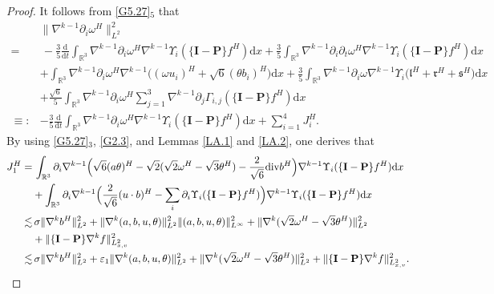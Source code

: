 \documentclass[reqno,11pt]{amsart}
\theoremstyle{plain}
\numberwithin{equation}{section}
\newcommand{\eps}{{\varepsilon}}
\begin{document}
\begin{proof}
It follows from \eqref{G5.27}$_5$ that
\begin{align}\label{G5.35}
 &\|\nabla^{k-1} \partial_i \omega^H\|_{L^2}^2\nonumber\\
=&\,  -\frac{3}{5} \frac{\mathrm{d}}{\mathrm{d} t} \int_{\mathbb{R}^3} \nabla^{k-1} \partial_i \omega^H \nabla^{k-1} \Upsilon_i(\{\mathbf{I}-\mathbf{P}\} f^H) \mathrm{d} x+\frac{3}{5} \int_{\mathbb{R}^3} \nabla^{k-1} \partial_i \partial_t \omega^H \nabla^{k-1} \Upsilon_i(\{\mathbf{I}-\mathbf{P}\} f^H) \mathrm{d} x \nonumber\\
& +\int_{\mathbb{R}^3} \nabla^{k-1} \partial_i \omega^H \nabla^{k-1} \big((\omega u_i)^H+\sqrt{6} (\theta b_i)^H \big) \mathrm{d} x+\frac{3}{5}\int_{\mathbb{R}^3} \nabla^{k-1} \partial_i \omega \nabla^{k-1}
 \Upsilon_i\big(\mathfrak{l}^H+\mathfrak{r}^H+\mathfrak{s}^H\big) \mathrm{d} x \nonumber\\
& +\frac{\sqrt{6}}{5} \int_{\mathbb{R}^3} \nabla^{k-1} \partial_i \omega^H    \sum_{j=1}^3 \nabla^{k-1}\partial_j \Gamma_{i, j}(\{\mathbf{I}-\mathbf{P}\} f^H)  \mathrm{d} x\nonumber\\
\equiv:& -\frac{3}{5} \frac{\mathrm{d}}{\mathrm{d} t} \int_{\mathbb{R}^3} \nabla^{k-1} \partial_i \omega^H \nabla^{k-1} \Upsilon_i(\{\mathbf{I}-\mathbf{P}\} f^H) \mathrm{d}x+\sum_{i=1}^4J_i^H.
\end{align}
By using \eqref{G5.27}$_3$, \eqref{G2.3}, and Lemmas \ref{LA.1} and \ref{LA.2}, one derives  that 
\begin{align}\label{G5.36}
J_1^H
= &\, \int_{\mathbb{R}^3} \partial_i \nabla^{k-1}\Big(\sqrt{6} (a \theta)^H-\sqrt{2}(\sqrt{2} \omega^H-\sqrt{3} \theta^H)-\frac{2}{\sqrt{6}} {\rm div}  b^H\Big)\nabla^{k-1} \Upsilon_i(\{\mathbf{I}-\mathbf{P}\} f^H) \mathrm{d} x \nonumber\\
&  +\int_{\mathbb{R}^3}\partial_i \nabla^{k-1}\Big(\frac{2}{\sqrt{6}} (u \cdot b)^H-\sum_i \partial_i \Upsilon_i(\{\mathbf{I}-\mathbf{P}\} f^H)\Big)  \nabla^{k-1} \Upsilon_i(\{\mathbf{I}-\mathbf{P}\} f^H) \mathrm{d} x \nonumber\\
\lesssim&\,  \sigma\|\nabla^k b^H\|_{L^2}^2+\|\nabla^k (a,b,u,\theta)\|_{L^2}^2\|(a,b,u,\theta)\|_{L^\infty}^2+\|\nabla^k(\sqrt{2}\omega^H-\sqrt{3}\theta^H)\|_{L^2}^2\nonumber\\
&+ \|\{\mathbf{I}-\mathbf{P}\} \nabla^k f\|_{L_{x,v}^2  }^2\nonumber\\
\lesssim&\,\sigma\|\nabla^k b^H\|_{L^2}^2+\eps_1\|\nabla^k (a,b,u,\theta)\|_{L^2}^2+\|\nabla^k(\sqrt{2}\omega^H-\sqrt{3}\theta^H)\|_{L^2}^2+ \|\{\mathbf{I}-\mathbf{P}\} \nabla^k f\|_{L_{x,v}^2  }^2.

\end{align}
\end{proof}
\end{document}
